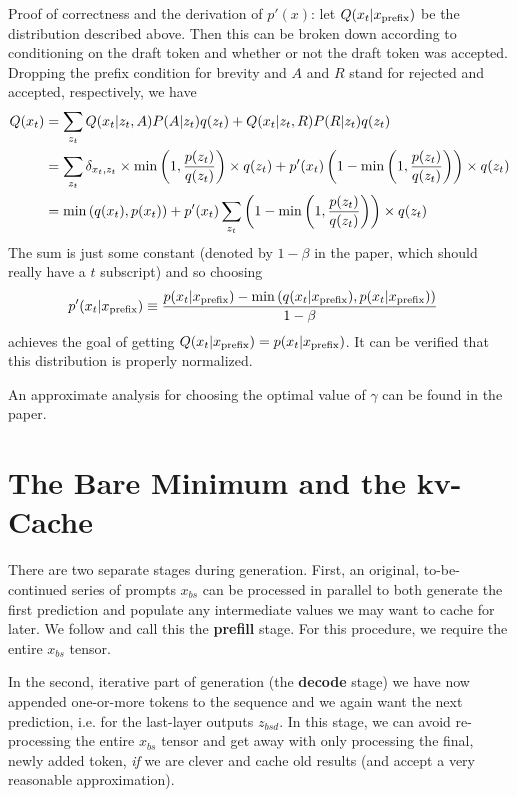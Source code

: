 \documentclass[11pt]{article}
\begin{document}
Proof of correctness and the derivation of $ p'(x) $: let $ Q(x_t| x _{ {\rm  prefix}  }) $ be
the distribution described above. Then this can be broken down according to conditioning on the
draft token and whether or not the draft token was accepted. Dropping the prefix condition for
brevity and $ A $ and $ R $ stand for rejected and accepted, respectively, we have
\begin{align}
    Q(x_t) &=\sum _{ z _{ t } } Q(x_t|z _{ t } , A)P(A|z _{ t }) q(z _{ t }) + Q(x_t|z _{ t } , R)P(R|z _{ t }) q(z _{ t }) \nonumber\\
         &=\sum _{ z _{ t } } \delta  _{ x _{ t }, z _{  t } } \times\min \left (1, \frac{ p(z _{ t }) }{ q( z _{ t })
         }\right ) \times q (z _{  t })  + p'(x _{ t })\left (1 - \min \left (1, \frac{ p(z _{ t }) }{ q( z _{ t })
         }\right )  \right) \times q(z _{ t }) \nonumber\\
         &= \min \left (q(x _{ t }),  p(x _{ t })\right ) + p'(x _{ t })\sum _{ z _{ t } }\left (1 - \min \left (1, \frac{ p(z _{ t }) }{ q( z _{ t })
         }\right )  \right) \times q(z _{ t })
\end{align}
The sum is just some constant (denoted by $ 1 - \beta  $ in the paper, which should really have a $
t $ subscript) and so choosing
\begin{align}
    p'(x _{ t }| x_{\rm prefix}) &\equiv \frac{ p(x _{ t }| x_{\rm prefix}) - \min \left ( q(x _{ t }| x_{\rm prefix}), p(x _{ t }| x_{\rm prefix}) \right ) }{ 1- \beta }
\end{align}
achieves the goal of getting $Q(x _{ t }| x_{\rm prefix}) = p(x _{ t }| x_{\rm prefix}) $. It can be
verified that this distribution is properly normalized.

An approximate analysis for choosing the optimal value of $ \gamma  $ can be found in the paper.


\section{The Bare Minimum and the kv-Cache \label{sec_kv_cache}}


There are two separate stages during generation. First, an original, to-be-continued series of prompts
$ x _{ bs }  $ can be processed in parallel to both generate the first prediction and populate any
intermediate values we may want to cache for later. We follow \cite{pope2022efficiently} and call this the
\textbf{prefill} stage. For this procedure, we require the entire $ x _{ bs } $ tensor.

In the second, iterative part of generation (the \textbf{decode} stage) we have now appended
one-or-more tokens to the sequence and we again want the next prediction, i.e. 
for the last-layer outputs $ z _{ bsd } $. In this stage, we can avoid re-processing the entire $ x
		_{ bs } $ tensor and get away with only processing the final, newly added token, \textit{if} we are
clever and cache old results (and accept a very reasonable approximation).
\end{document}
